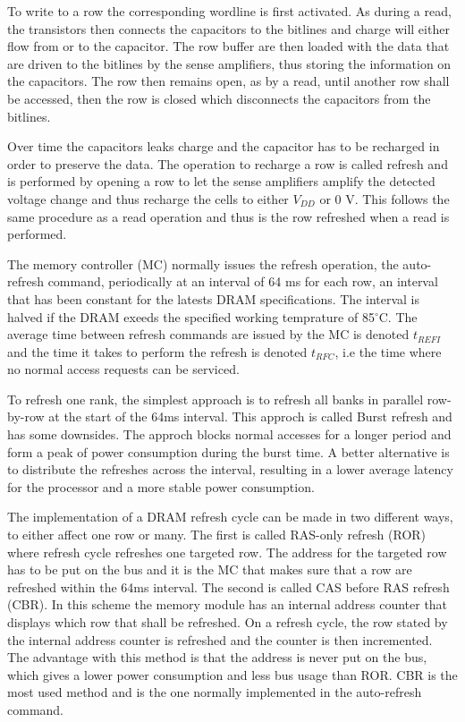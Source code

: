 To write to a row the corresponding wordline is first activated. As during a read, the transistors then connects the capacitors to the bitlines and charge will either flow from or to the capacitor. The row buffer are then loaded with the data that are driven to the bitlines by the sense amplifiers, thus storing the information on the capacitors. The row then remains open, as by a read, until another row shall be accessed, then the row is closed which disconnects the capacitors from the bitlines.

Over time the capacitors leaks charge and the capacitor has to be recharged in order to preserve the data. The operation to recharge a row is called refresh and is performed by opening a row to let the sense amplifiers amplify the detected voltage change and thus recharge the cells to either \(V_{DD}\) or 0 V. This follows the same procedure as a read operation and thus is the row refreshed when a read is performed. 

The memory controller (MC) normally issues the refresh operation, the auto-refresh command, periodically at an interval of 64 ms for each row, an interval that has been constant for the latests DRAM specifications. The interval is halved if the DRAM exeeds the specified working temprature of 85$^{\circ}$C. The average time between refresh commands are issued by the MC is denoted \(t_{REFI}\) and the time it takes to perform the refresh is denoted \(t_{RFC}\), i.e the time where no normal access requests can be serviced.

To refresh one rank, the simplest approach is to refresh all banks in parallel row-by-row at the start of the 64ms interval. This approch is called Burst refresh and has some downsides. The approch blocks normal accesses for a longer period and form a peak of power consumption during the burst time. A better alternative is to distribute the refreshes across the interval, resulting in a lower average latency for the processor and a more stable power consumption.

The implementation of a DRAM refresh cycle can be made in two different ways, to either affect one row or many. The first is called RAS-only refresh (ROR) where refresh cycle refreshes one targeted row. The address for the targeted row has to be put on the bus and it is the MC that makes sure that a row are refreshed within the 64ms interval. The second is called CAS before RAS refresh (CBR). In this scheme the memory module has an internal address counter that displays which row that shall be refreshed. On a refresh cycle, the row stated by the internal address counter is refreshed and the counter is then incremented. The advantage with this method is that the address is never put on the bus, which gives a lower power consumption and less bus usage than ROR. CBR is the most used method and is the one normally implemented in the auto-refresh command. 

